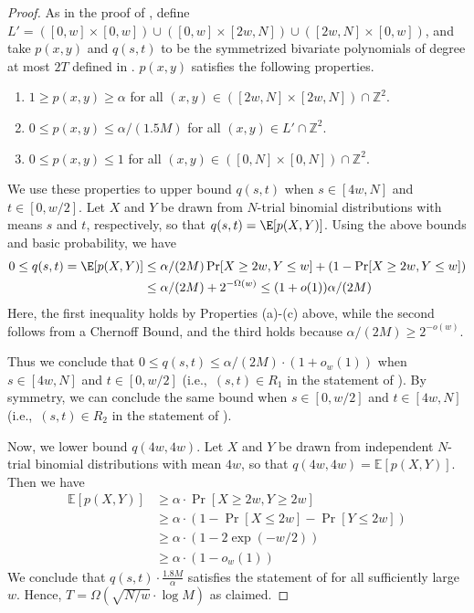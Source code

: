 \begin{proof}
As in the proof of , define $L' = ([0, w] \times [0, w]) \cup ([0, w] \times [2w, N]) \cup ([2w, N] \times [0, w])$, and
take $p(x,y)$ and $q(s, t)$ to be the symmetrized bivariate polynomials of degree at most $2T$ defined in . $p(x, y)$ satisfies the following 
properties. 
\begin{enumerate}
\item[(a)] $1 \ge p(x, y) \ge \alpha$ for all $(x, y) \in \left([2w, N] \times [2w, N]\right) \cap \mathbb{Z}^2$.
\item[(b)] $0 \le p(x, y) \le \alpha/(1.5 M)$ for all $(x, y) \in L' \cap \mathbb{Z}^2$.
\item[(c)] $0 \leq p(x,y) \leq 1$ for all $(x, y) \in \left( [0,N] \times [0, N]\right) \cap \mathbb{Z}^2$.
\end{enumerate}


We use these properties to upper bound $q(s, t)$ when $s \in [4w, N]$ and $t \in [0, w/2]$. Let $X$ and $Y$ be drawn from $N$-trial binomial distributions with means $s$ and $t$, respectively,
so that $q(s, t) = \E[p(X,Y)]$. Using the above bounds and basic probability, we have 
\begin{align*}
0 \leq q(s, t)=\E[p(X,Y)] &\le \alpha/(2M) \Pr[X \ge 2w, Y \le w]  + 
(1-\Pr[X \ge 2w, Y \le w])
\\
&\le  \alpha/(2M) + 2^{-\Omega(w)} \leq (1+o(1)) \alpha/(2 M)
\end{align*}
Here, the first inequality holds by Properties (a)-(c) above,
while the second follows from a Chernoff Bound, and the third holds because
$\alpha/(2 M) \geq 2^{-o(w)}$.

Thus we conclude that $0 \le q(s, t) \le \alpha/(2M) \cdot (1 + o_w(1))$ when $s \in [4w, N]$ and $t \in [0, w/2]$ (i.e.,\ $(s, t) \in R_1$ in the statement of ). By symmetry, we can conclude the same bound when $s \in [0, w/2]$ and $t \in [4w, N]$ (i.e.,\ $(s, t) \in R_2$ in the statement of ).

Now, we lower bound $q(4w, 4w)$. Let $X$ and $Y$ be drawn from independent $N$-trial binomial distributions with mean $4w$, so that $q(4w, 4w) = \mathbb{E}\left[p(X,Y)\right]$. Then we have 
\begin{align*}
\mathbb{E}\left[p(X,Y)\right] &\ge \alpha \cdot \Pr[X \ge 2w, Y \ge 2w]\\
&\ge \alpha \cdot \left(1 - \Pr[X \le 2w] - \Pr[Y \le 2w]\right)\\
&\ge \alpha \cdot \left(1 - 2\exp(-w/2)\right)\\
&\ge \alpha \cdot (1 - o_w(1))
\end{align*}
We conclude that $q(s, t) \cdot \frac{1.8 M}{\alpha}$ satisfies the statement of  for all sufficiently large $w$.
Hence, $T = \Omega\left(\sqrt{N/w} \cdot \log M\right)$ as claimed.
\end{proof}


